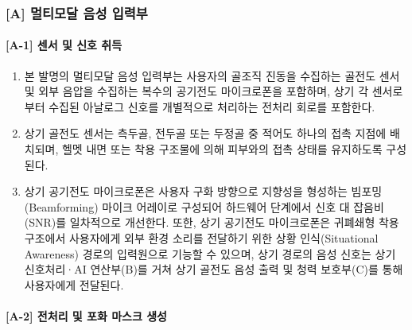 \documentclass{article}
\begin{document}
\subsubsection{[A] 멀티모달 음성 입력부}

\paragraph{[A-1] 센서 및 신호 취득}

\begin{enumerate}[label = \textbf{(A.1.\arabic*)}]

    \item 본 발명의 멀티모달 음성 입력부는 사용자의 골조직 진동을 수집하는 골전도 센서 및 외부 음압을 수집하는 복수의 공기전도 마이크로폰을 포함하며, 상기 각 센서로부터 수집된 아날로그 신호를 개별적으로 처리하는 전처리 회로를 포함한다.

    \item 상기 골전도 센서는 측두골, 전두골 또는 두정골 중 적어도 하나의 접촉 지점에 배치되며, 헬멧 내면 또는 착용 구조물에 의해 피부와의 접촉 상태를 유지하도록 구성된다.

    \item 상기 공기전도 마이크로폰은 사용자 구화 방향으로 지향성을 형성하는 빔포밍(Beamforming) 마이크 어레이로 구성되어 하드웨어 단계에서 신호 대 잡음비(SNR)를 일차적으로 개선한다. 
    또한, 상기 공기전도 마이크로폰은 귀폐쇄형 착용 구조에서 사용자에게 외부 환경 소리를 전달하기 위한 상황 인식(Situational Awareness) 경로의 입력원으로 기능할 수 있으며, 상기 경로의 음성 신호는 상기 신호처리·AI 연산부(B)를 거쳐 상기 골전도 음성 출력 및 청력 보호부(C)를 통해 사용자에게 전달된다.

\end{enumerate}


\paragraph{[A-2] 전처리 및 포화 마스크 생성}
\end{document}

